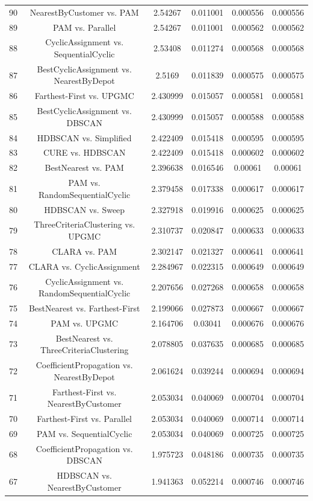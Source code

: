 \documentclass[a4paper,10pt]{article}
\begin{document}
\begin{landscape}
\begin{table}[!htp]
\begin{tabular}{cccccc}
90&NearestByCustomer vs. PAM&2.54267&0.011001&0.000556&0.000556\\
89&PAM vs. Parallel&2.54267&0.011001&0.000562&0.000562\\
88&CyclicAssignment vs. SequentialCyclic&2.53408&0.011274&0.000568&0.000568\\
87&BestCyclicAssignment vs. NearestByDepot&2.5169&0.011839&0.000575&0.000575\\
86&Farthest-First vs. UPGMC&2.430999&0.015057&0.000581&0.000581\\
85&BestCyclicAssignment vs. DBSCAN&2.430999&0.015057&0.000588&0.000588\\
84&HDBSCAN vs. Simplified&2.422409&0.015418&0.000595&0.000595\\
83&CURE vs. HDBSCAN&2.422409&0.015418&0.000602&0.000602\\
82&BestNearest vs. PAM&2.396638&0.016546&0.00061&0.00061\\
81&PAM vs. RandomSequentialCyclic&2.379458&0.017338&0.000617&0.000617\\
80&HDBSCAN vs. Sweep&2.327918&0.019916&0.000625&0.000625\\
79&ThreeCriteriaClustering vs. UPGMC&2.310737&0.020847&0.000633&0.000633\\
78&CLARA vs. PAM&2.302147&0.021327&0.000641&0.000641\\
77&CLARA vs. CyclicAssignment&2.284967&0.022315&0.000649&0.000649\\
76&CyclicAssignment vs. RandomSequentialCyclic&2.207656&0.027268&0.000658&0.000658\\
75&BestNearest vs. Farthest-First&2.199066&0.027873&0.000667&0.000667\\
74&PAM vs. UPGMC&2.164706&0.03041&0.000676&0.000676\\
73&BestNearest vs. ThreeCriteriaClustering&2.078805&0.037635&0.000685&0.000685\\
72&CoefficientPropagation vs. NearestByDepot&2.061624&0.039244&0.000694&0.000694\\
71&Farthest-First vs. NearestByCustomer&2.053034&0.040069&0.000704&0.000704\\
70&Farthest-First vs. Parallel&2.053034&0.040069&0.000714&0.000714\\
69&PAM vs. SequentialCyclic&2.053034&0.040069&0.000725&0.000725\\
68&CoefficientPropagation vs. DBSCAN&1.975723&0.048186&0.000735&0.000735\\
67&HDBSCAN vs. NearestByCustomer&1.941363&0.052214&0.000746&0.000746\\

\end{tabular}
\end{table}
\end{landscape}
\end{document}
